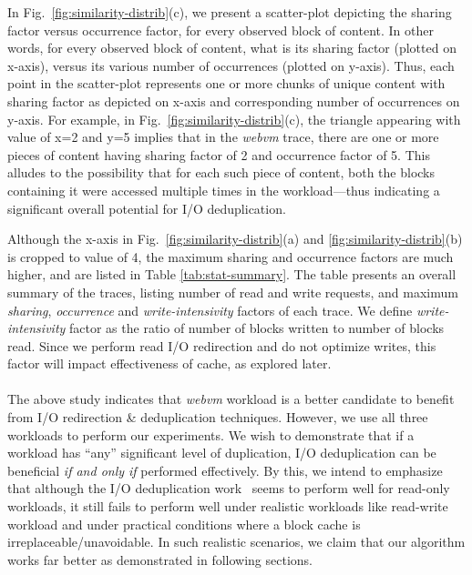In Fig.~\ref{fig:similarity-distrib}(c), we present a scatter-plot depicting
the sharing factor versus occurrence factor, for every observed block of content.
In other words, for every observed block of content, 
what is its sharing factor (plotted on x-axis), 
versus its various number of occurrences (plotted on y-axis).
Thus, each point in the scatter-plot represents one or more chunks of unique
content with sharing factor as depicted on x-axis and corresponding
number of occurrences on y-axis. For example, in Fig.~\ref{fig:similarity-distrib}(c),
the triangle appearing with value of x=2 and y=5 implies that in the 
\textit{webvm} trace, there are one or more pieces of content having
sharing factor of 2 and occurrence factor of 5. This alludes to the possibility
that for each such piece of content, both the blocks containing it 
were accessed multiple times in the workload---thus
indicating a significant overall potential for I/O deduplication.

Although the x-axis in
Fig.~\ref{fig:similarity-distrib}(a) and \ref{fig:similarity-distrib}(b)
is cropped to
value of 4, the maximum sharing and occurrence factors
are much higher, and are listed in Table \ref{tab:stat-summary}.
The table presents an overall summary of the traces,
listing number of read and write requests, and
maximum \textit{sharing}, \textit{occurrence} and
\textit{write-intensivity} factors of each trace.
We define \textit{write-intensivity}
factor as the ratio of number of blocks written to number of blocks read. Since
we perform read I/O redirection 
and do not optimize writes, this factor
will impact effectiveness of cache, as explored later.
\\
\\
The above study indicates that \textit{webvm} workload is a better candidate to
benefit from I/O redirection \& deduplication techniques. However,
we use all three workloads
to perform our experiments. We wish to demonstrate that if a workload has
``any'' significant level of duplication, I/O deduplication can be beneficial
\textit{if and only if} performed effectively. By this, we intend to emphasize
that although the I/O deduplication work~\cite{iodedup} seems to perform well for 
read-only workloads, it still fails to perform well under realistic workloads
like read-write workload and under practical conditions where a block cache
is irreplaceable/unavoidable. In such realistic scenarios, we claim that 
our algorithm works far better as demonstrated in following sections.

